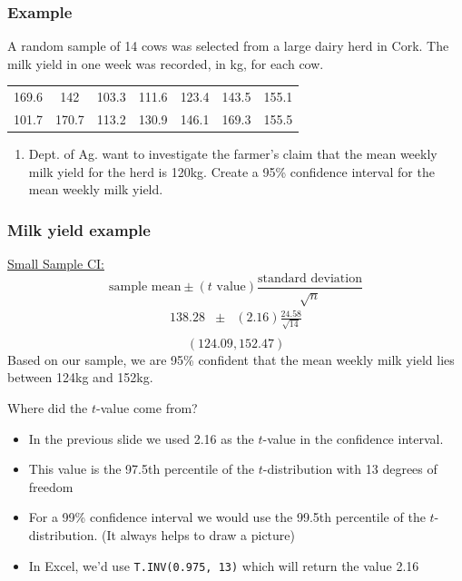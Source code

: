 \documentclass[12pt,xcolor=dvipsnames,handout,mathserif,aspectratio=169]{beamer}
\begin{document}
\begin{frame}\frametitle{Example}
A random sample of 14 cows was selected from a large dairy herd in Cork. The milk yield in one week was recorded, in kg, for each cow. \\
\vspace{0.5cm}
\begin{tabular}{ccccccc}
169.6&142&103.3&111.6&123.4&143.5&155.1\\
101.7&170.7&113.2&130.9&146.1&169.3&155.5
\end{tabular}
\vspace{0.5cm}

\begin{enumerate}
\item Dept. of Ag. want to investigate the farmer's claim that the mean weekly milk yield for the herd is 120kg. Create a 95\% confidence interval for the mean weekly milk yield.
\end{enumerate}
\end{frame}


\begin{frame}\frametitle{Milk yield example}
\underline{Small Sample CI:}\\
$$\mbox{sample mean} \pm (\mbox{$t$ value}) \frac{\mbox{standard deviation}}{\sqrt{n}}$$
\begin{eqnarray*}
138.28 & \pm & (2.16) \frac{24.58}{\sqrt{14}}\\
\end{eqnarray*}
$$(124.09, 152.47)$$
Based on our sample, we are 95\% confident that the mean weekly milk yield lies between 124kg and 152kg.
\end{frame}

\begin{frame}{Where did the $t$-value come from?}

\begin{itemize}
\item In the previous slide we used 2.16 as the $t$-value in the confidence interval. 
\item This value is the 97.5th percentile of the $t$-distribution with 13 degrees of freedom
\item For a 99\% confidence interval we would use the 99.5th percentile of the $t$-distribution. (It always helps to draw a picture)
\item In Excel, we'd use \texttt{T.INV(0.975, 13)} which will return the value 2.16
\end{itemize}

\end{frame}
\end{document}
